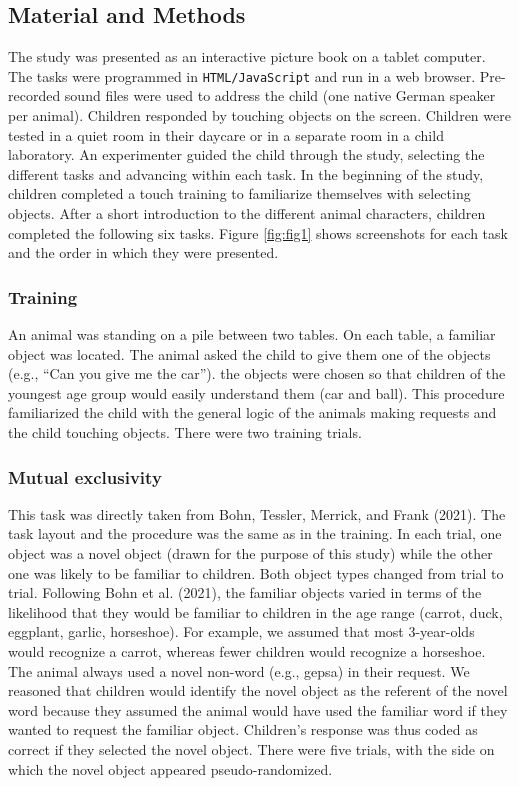 \documentclass[
  english,
  man,floatsintext]{apa6}
\begin{document}
\hypertarget{material-and-methods}{%
\subsection{Material and Methods}\label{material-and-methods}}

The study was presented as an interactive picture book on a tablet computer. The tasks were programmed in \texttt{HTML/JavaScript} and run in a web browser. Pre-recorded sound files were used to address the child (one native German speaker per animal). Children responded by touching objects on the screen. Children were tested in a quiet room in their daycare or in a separate room in a child laboratory. An experimenter guided the child through the study, selecting the different tasks and advancing within each task. In the beginning of the study, children completed a touch training to familiarize themselves with selecting objects. After a short introduction to the different animal characters, children completed the following six tasks. Figure \ref{fig:fig1} shows screenshots for each task and the order in which they were presented.

\hypertarget{training}{%
\subsubsection{Training}\label{training}}

An animal was standing on a pile between two tables. On each table, a familiar object was located. The animal asked the child to give them one of the objects (e.g., ``Can you give me the car''). the objects were chosen so that children of the youngest age group would easily understand them (car and ball). This procedure familiarized the child with the general logic of the animals making requests and the child touching objects. There were two training trials.

\hypertarget{mutual-exclusivity}{%
\subsubsection{Mutual exclusivity}\label{mutual-exclusivity}}

This task was directly taken from Bohn, Tessler, Merrick, and Frank (2021). The task layout and the procedure was the same as in the training. In each trial, one object was a novel object (drawn for the purpose of this study) while the other one was likely to be familiar to children. Both object types changed from trial to trial. Following Bohn et al. (2021), the familiar objects varied in terms of the likelihood that they would be familiar to children in the age range (carrot, duck, eggplant, garlic, horseshoe). For example, we assumed that most 3-year-olds would recognize a carrot, whereas fewer children would recognize a horseshoe. The animal always used a novel non-word (e.g., gepsa) in their request. We reasoned that children would identify the novel object as the referent of the novel word because they assumed the animal would have used the familiar word if they wanted to request the familiar object. Children's response was thus coded as correct if they selected the novel object. There were five trials, with the side on which the novel object appeared pseudo-randomized.
\end{document}
